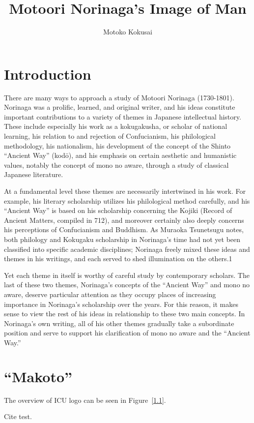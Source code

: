 \documentclass[12pt]{report}
\title{Motoori Norinaga’s Image of Man}
\author{Motoko Kokusai}
\date{}
\begin{document}

\doublespacing


\setcounter{tocdepth}{3}
\tableofcontents

\chapter{Introduction}
There are many ways to approach a study of Motoori Norinaga (1730-1801). Norinaga was
a prolific, learned, and original writer, and his ideas constitute important contributions to a
variety of themes in Japanese intellectual history. These include especially his work as a
kokugakusha, or scholar of national learning, his relation to and rejection of Confucianism,
his philological methodology, his nationalism, his development of the concept of the Shinto
“Ancient Way” (kodō), and his emphasis on certain aesthetic and humanistic values, notably
the concept of mono no aware, through a study of classical Japanese literature.

At a fundamental level these themes are necessarily intertwined in his work. For
example, his literary scholarship utilizes his philological method carefully, and his “Ancient
Way” is based on his scholarship concerning the Kojiki (Record of Ancient Matters, compiled
in 712), and moreover certainly also deeply concerns his perceptions of Confucianism and
Buddhism. As Muraoka Tsunetsugu notes, both philology and Kokugaku scholarship in
Norinaga's time had not yet been classified into specific academic disciplines; Norinaga
freely mixed these ideas and themes in his writings, and each served to shed illumination on
the others.1

Yet each theme in itself is worthy of careful study by contemporary scholars. The last of
these two themes, Norinaga's concepts of the “Ancient Way” and mono no aware, deserve
particular attention as they occupy places of increasing importance in Norinaga's scholarship
over the years. For this reason, it makes sense to view the rest of his ideas in relationship to
these two main concepts. In Norinaga's own writing, all of his other themes gradually take
a subordinate position and serve to support his clarification of mono no aware and the
“Ancient Way.”


\chapter{“Makoto”}
The overview of ICU logo can be seen in Figure~\ref{1.1}.

Cite test\cite{ishikawa1984}. 
\end{document}
